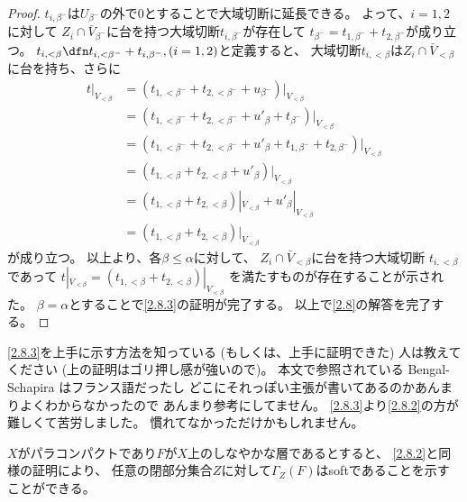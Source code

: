 \documentclass[uplatex,dvipdfmx]{jsarticle}
\begin{document}
\begin{proof}
  \(t_{i,\beta^-}\)は\(U_{\beta^-}\)の外で\(0\)とすることで大域切断に延長できる。
  よって、\(i=1,2\)に対して
  \(Z_i\cap \bar{V}_{\beta^-}\)に台を持つ大域切断\(t_{i,\beta^-}\)が存在して
  \(t_{\beta^-}=t_{1,\beta^-}+t_{2,\beta^-}\)が成り立つ。
  \(t_{i,<\beta}\dfn t_{i,<\beta^-} + t_{i,\beta^-}, (i=1,2)\)と定義すると、
  大域切断\(t_{i,<\beta}\)は\(Z_i\cap \bar{V}_{<\beta}\)に台を持ち、さらに
  \begin{align*}
    t|_{V_{<\beta}}
    &= (t_{1,<\beta^-}+t_{2,<\beta^-} + u_{\beta^-})|_{V_{<\beta}} \\
    &= (t_{1,<\beta^-}+t_{2,<\beta^-} + u'_{\beta} + t_{\beta^-})|_{V_{<\beta}} \\
    &= (t_{1,<\beta^-}+t_{2,<\beta^-} + u'_{\beta}
    + t_{1,\beta^-}+t_{2,\beta^-})|_{V_{<\beta}} \\
    &= (t_{1,<\beta}+t_{2,<\beta} + u'_{\beta})|_{V_{<\beta}} \\
    &= (t_{1,<\beta}+t_{2,<\beta})|_{V_{<\beta}} + u'_{\beta}|_{V_{<\beta}} \\
    &= (t_{1,<\beta}+t_{2,<\beta})|_{V_{<\beta}}
  \end{align*}
  が成り立つ。
  以上より、各\(\beta\leq \alpha\)に対して、
  \(Z_i\cap \bar{V}_{<\beta}\)に台を持つ大域切断
  \(t_{i,<\beta}\)であって
  \(t|_{V_{<\beta}} = (t_{1,<\beta}+t_{2,<\beta})|_{V_{<\beta}}\)
  を満たすものが存在することが示された。
  \(\beta=\alpha\)とすることで\ref{2.8.3}の証明が完了する。
  以上で\autoref{2.8}の解答を完了する。
\end{proof}


\begin{kansou*}
  \ref{2.8.3}を上手に示す方法を知っている (もしくは、上手に証明できた) 人は教えてください
  (上の証明はゴリ押し感が強いので)。
  本文で参照されている Bengal-Schapira はフランス語だったし
  どこにそれっぽい主張が書いてあるのかあんまりよくわからなかったので
  あんまり参考にしてません。
  \ref{2.8.3}より\ref{2.8.2}の方が難しくて苦労しました。
  慣れてなかっただけかもしれません。
\end{kansou*}


\begin{rem*}
  \(X\)がパラコンパクトであり\(F\)が\(X\)上のしなやかな層であるとすると、
  \ref{2.8.2}と同様の証明により、
  任意の閉部分集合\(Z\)に対して\(\Gamma_Z(F)\)はsoftであることを示すことができる。
\end{rem*}
\end{document}
